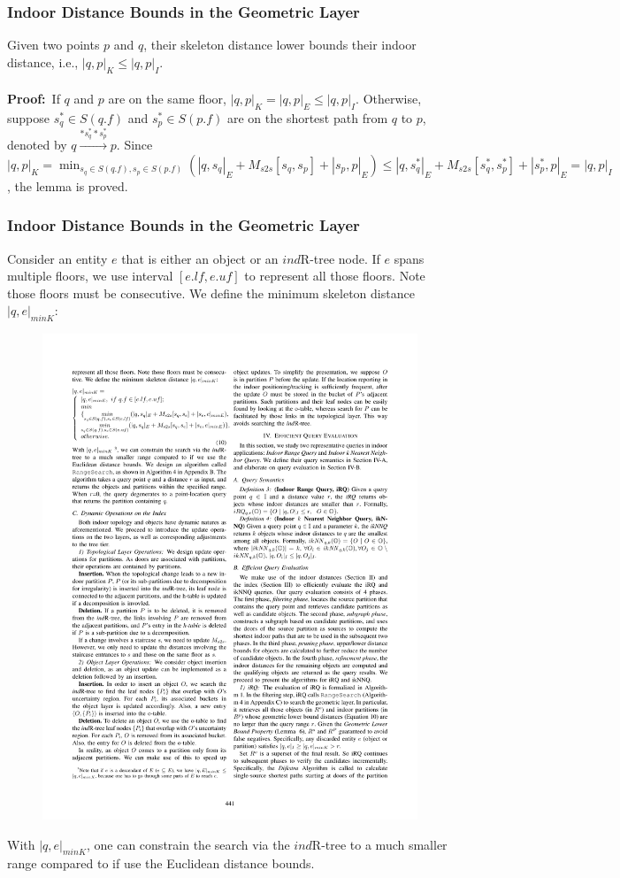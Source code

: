 \begin{frame}
\frametitle{Indoor Distance Bounds in the Geometric Layer}

\begin{lemma}
  Given two points $p$ and $q$, their skeleton distance lower bounds their indoor distance, i.e., $|q,p|_K \leq |q,p|_I$.\\~\\
  \textbf{Proof:}~If $q$ and $p$ are on the same floor, $|q,p|_K = |q,p|_E \leq |q,p|_I$. Otherwise, suppose $s_{q}^{*} \in S(q.f)$ and $s_{p}^{*} \in S(p.f)$ are on the shortest path from $q$ to $p$, denoted by $q \overset{*s_{q}^{*}*s_{p}^{*}}{\rightarrow} p$. Since $|q,p|_K = \min_{s_q \in S(q.f), s_p \in S(p.f)}(|q,s_q|_E + M_{s2s}[s_q,s_p] + |s_p, p|_E) \leq |q,s_{q}^{*}|_E + M_{s2s}[s_{q}^{*},s_{p}^{*}] + |s_{p}^{*}, p|_E = |q,p|_I$, the lemma is proved.
\end{lemma}

\end{frame}


\begin{frame}
\frametitle{Indoor Distance Bounds in the Geometric Layer}

Consider an entity $e$ that is either an object or an $ind$R-tree node. If $e$ spans multiple floors, we use interval $[e.lf,e.uf]$ to represent all those floors. Note those floors must be consecutive. We define the minimum skeleton distance $|q,e|_{minK}$:

\begin{figure}[tb]
  \includegraphics[width=0.7\columnwidth]{figures/2-6/2-6-12.pdf}
\end{figure}

With $|q,e|_{minK}$, one can constrain the search via the $ind$R-tree to a much smaller range compared to if use the Euclidean distance bounds.

\end{frame}
